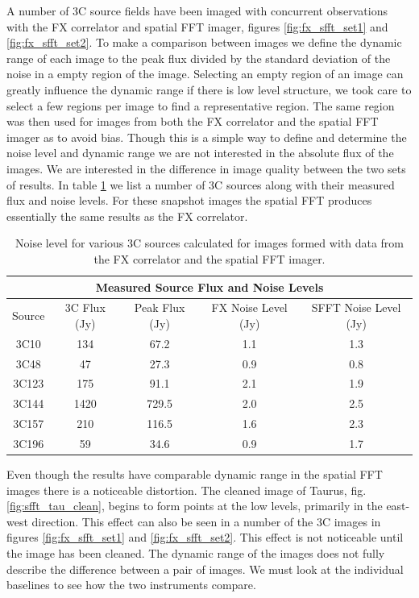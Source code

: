 \documentclass[useAMS,macros,usenatbib,onecolumn]{mn2e}
\begin{document}
A number of 3C source fields have been imaged with concurrent observations with the FX correlator and spatial FFT imager, figures \ref{fig:fx_sfft_set1} and \ref{fig:fx_sfft_set2}.
To make a comparison between images we define the dynamic range of each image to the peak flux divided by the standard deviation of the noise in a empty region of the image.
Selecting an empty region of an image can greatly influence the dynamic range if there is low level structure, we took care to select a few regions per image to find a representative region.
The same region was then used for images from both the FX correlator and the spatial FFT imager as to avoid bias.
Though this is a simple way to define and determine the noise level and dynamic range we are not interested in the absolute flux of the images.
We are interested in the difference in image quality between the two sets of results.
In table \ref{tbl:src_flux} we list a number of 3C sources along with their measured flux and noise levels.
For these snapshot images the spatial FFT produces essentially the same results as the FX correlator.

\begin{table}
\begin{center}
\begin{tabular}{|c||c|c|c|c|}
\multicolumn{5}{|c|}{Measured Source Flux and Noise Levels}\\
\hline
Source & 3C Flux (Jy) & Peak Flux (Jy) & FX Noise Level (Jy) & SFFT Noise Level (Jy) \\ \hline
    3C10  &   134 &  67.2 & 1.1 & 1.3 \\
    3C48  &    47 &  27.3 & 0.9 & 0.8 \\
    3C123 &   175 &  91.1 & 2.1 & 1.9 \\
    3C144 &  1420 & 729.5 & 2.0 & 2.5 \\
    3C157 &   210 & 116.5 & 1.6 & 2.3 \\
    3C196 &    59 &  34.6 & 0.9 & 1.7 \\ \hline
\end{tabular}
\caption{Noise level for various 3C sources calculated for images formed with data from the FX correlator and the spatial FFT imager.}
\label{tbl:src_flux}
\end{center}
\end{table}

Even though the results have comparable dynamic range in the spatial FFT images there is a noticeable distortion.
The cleaned image of Taurus, fig. \ref{fig:sfft_tau_clean}, begins to form points at the low levels, primarily in the east-west direction.
This effect can also be seen in a number of the 3C images in figures \ref{fig:fx_sfft_set1} and \ref{fig:fx_sfft_set2}.
This effect is not noticeable until the image has been cleaned.
The dynamic range of the images does not fully describe the difference between a pair of images.
We must look at the individual baselines to see how the two instruments compare.
\end{document}
